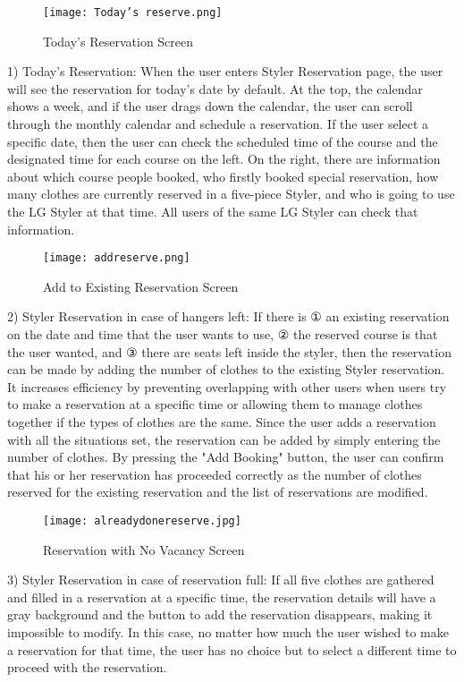 \documentclass[conference]{IEEEtran}
\begin{document}
\begin{figure}[htbp]
\centerline{\texttt{[image: Today's reserve.png]}}
\label{fig}
\caption{Today's Reservation Screen}
\end{figure}
1) Today's Reservation: When the user enters Styler Reservation page, the user will see the reservation for today's date by default. At the top, the calendar shows a week, and if the user drags down the calendar, the user can scroll through the monthly calendar and schedule a reservation.
If the user select a specific date, then the user can check the scheduled time of the course and the designated time for each course on the left. On the right, there are information about which course people booked, who firstly booked special reservation, how many clothes are currently reserved in a five-piece Styler, and who is going to use the LG Styler at that time. All users of the same LG Styler can check that information.\\

\begin{figure}[htbp]
\centerline{\texttt{[image: addreserve.png]}}
\label{fig}
\caption{Add to Existing Reservation Screen}
\end{figure}
2) Styler Reservation in case of hangers left: If there is ① an existing reservation on the date and time that the user wants to use, ② the reserved course is that the user wanted, and ③ there are seats left inside the styler, then the reservation can be made by adding the number of clothes to the existing Styler reservation. It increases efficiency by preventing overlapping with other users when users try to make a reservation at a specific time or allowing them to manage clothes together if the types of clothes are the same.
Since the user adds a reservation with all the situations set, the reservation can be added by simply entering the number of clothes. By pressing the "Add Booking" button, the user can confirm that his or her reservation has proceeded correctly as the number of clothes reserved for the existing reservation and the list of reservations are modified.\\

\newpage
\begin{figure}[htbp]
\centerline{\texttt{[image: alreadydonereserve.jpg]}}
\label{fig}
\caption{Reservation with No Vacancy Screen}
\end{figure}
3) Styler Reservation in case of reservation full: If all five clothes are gathered and filled in a reservation at a specific time, the reservation details will have a gray background and the button to add the reservation disappears, making it impossible to modify. In this case, no matter how much the user wished to make a reservation for that time, the user has no choice but to select a different time to proceed with the reservation.\\
\end{document}

